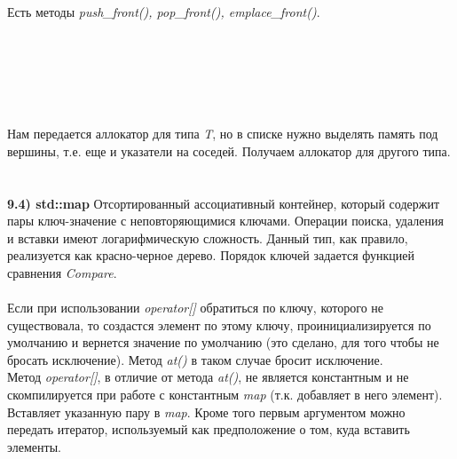 \documentclass{article}
\begin{document}
Есть методы \textit{push\_front(), pop\_front(), emplace\_front()}.\\\\\\\\\\\\\\
Нам передается аллокатор для типа \textit{T}, но в списке нужно выделять память под вершины, т.е. еще и указатели на соседей.
Получаем аллокатор для другого типа.\\\\
\noindent \\ \textbf{9.4) std::map}
Отсортированный ассоциативный контейнер, который содержит пары ключ-значение с неповторяющимися ключами. Операции поиска, удаления и вставки имеют логарифмическую сложность. Данный тип, как правило, реализуется как красно-черное дерево.
Порядок ключей задается функцией сравнения \textit{Compare}.\\\\ 
Если при использовании \textit{operator[]} обратиться по ключу, которого не существовала, то создастся элемент по этому ключу, проинициализируется по умолчанию и вернется значение по умолчанию (это сделано, для того чтобы не бросать исключение).
Метод \textit{at()} в таком случае бросит исключение.\\
Метод \textit{operator[]}, в отличие от метода \textit{at()}, не является константным и не скомпилируется при работе с константным \textit{map} (т.к. добавляет в него элемент).
Вставляет указанную пару в \textit{map}. Кроме того первым аргументом можно передать итератор, используемый как предположение о том, куда вставить элементы.
\end{document}
